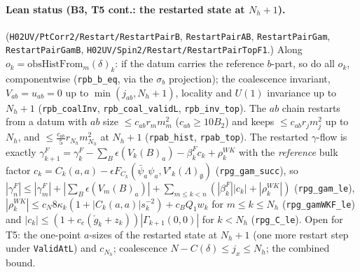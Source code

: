 \documentclass[11pt]{amsart}
\theoremstyle{definition}
\theoremstyle{remark}
\numberwithin{equation}{section}
\begin{document}
\paragraph{Lean status (B3, T5 cont.: the restarted state at $N_h+1$).}
(\texttt{H02UV/PtCorr2/Restart/RestartPairB}, \texttt{RestartPairAB}, \texttt{RestartPairGam}, \texttt{RestartPairGamB},
\texttt{H02UV/Spin2/Restart/RestartPairTopF1}.) Along $o_k=\mathrm{obsHistFrom}_m(\delta)_k$: if the datum carries the reference
$b$-part, so do all $o_k$, componentwise (\texttt{rpb\_b\_eq}, via the $\sigma_b$ projection); the coalescence
invariant, $V_{ab}=u_{ab}=0$ up to $\min(j_{ab},N_h+1)$, locality and $U(1)$ invariance up to $N_h+1$
(\texttt{rpb\_coalInv}, \texttt{rpb\_coal\_validL}, \texttt{rpb\_inv\_top}). The $ab$ chain restarts from a datum with
$ab$ size $\le c_{ab}r_mm_m^2$ ($c_{ab}\ge10B_2$) and keeps $\le c_{ab}r_jm_j^2$ up to $N_h$, and
$\le\frac{c_{ab}}5r_{N_h}m_{N_h}^2$ at $N_h+1$ (\texttt{rpab\_hist}, \texttt{rpab\_top}). The restarted $\gamma$-flow is
exactly $\gamma^F_{k+1}=\gamma^F_k-\sum_B\epsilon(V_k(B)_a)-\beta^F_kc_k+\rho^{WK}_k$ with the \emph{reference}
bulk factor $c_k=C_k(a,a)-\epsilon F_{C_k}(\bar\psi_a\psi_a,V'_k(\Lambda)_\emptyset)$ (\texttt{rpg\_gam\_succ}), so
$|\gamma^F_n|\le|\gamma^F_m|+|\sum_B\epsilon(V_m(B)_a)|+\sum_{m\le k<n}(|\beta^F_k||c_k|+|\rho^{WK}_k|)$
(\texttt{rpg\_gam\_le}), $|\rho^{WK}_k|\le c_N8\kappa_k(1+|C_k(a,a)|s_k^{-2})+c_BQ_1w_k$ for $m\le k\le N_h$
(\texttt{rpg\_gamWKF\_le}) and $|c_k|\le(1+c_e(\check g_k+z_k))|\Gamma_{k+1}(0,0)|$ for $k<N_h$
(\texttt{rpg\_C\_le}). Open for T5: the one-point $a$-sizes of the restarted state at $N_h+1$ (one more
restart step under \texttt{ValidAtL}) and $c_{N_h}$; coalescence $N-C(\delta)\le j_x\le N_h$; the combined bound.
\end{document}
